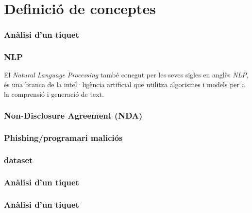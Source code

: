 \section{Definició de conceptes}
\subsubsection{Anàlisi d'un tiquet}
\subsubsection{NLP}
 El \textit{Natural Language Processing} també conegut per les seves sigles en anglès \textit{NLP}, és una branca de la intel·ligència artificial que utilitza algorismes i models per a la comprensió i generació de text.
\subsubsection{Non-Disclosure Agreement (NDA)}
\subsubsection{Phishing/programari maliciós}
\subsubsection{dataset}
\subsubsection{Anàlisi d'un tiquet}
\subsubsection{Anàlisi d'un tiquet}
